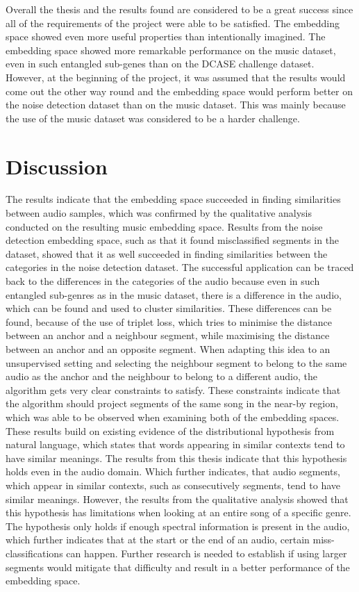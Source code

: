 \newline
\newline
Overall the thesis and the results found are considered to be a great success since all of the requirements of the project were able to be satisfied. The embedding space showed even more useful properties than intentionally imagined. The embedding space showed more remarkable performance on the music dataset, even in such entangled sub-genes than on the \gls{DCASE} challenge dataset. However, at the beginning of the project, it was assumed that the results would come out the other way round and the embedding space would perform better on the noise detection dataset than on the music dataset. This was mainly because the use of the music dataset was considered to be a harder challenge.

\section{Discussion}
\label{sec:Discussion}
The results indicate that the embedding space succeeded in finding similarities between audio samples, which was confirmed by the qualitative analysis conducted on the resulting music embedding space. Results from the noise detection embedding space, such as that it found misclassified segments in the dataset, showed that it as well succeeded in finding similarities between the categories in the noise detection dataset. The successful application can be traced back to the differences in the categories of the audio because even in such entangled sub-genres as in the music dataset, there is a difference in the audio, which can be found and used to cluster similarities. These differences can be found, because of the use of triplet loss, which tries to minimise the distance between an anchor and a neighbour segment, while maximising the distance between an anchor and an opposite segment. When adapting this idea to an unsupervised setting and selecting the neighbour segment to belong to the same audio as the anchor and the neighbour to belong to a different audio, the algorithm gets very clear constraints to satisfy. These constraints indicate that the algorithm should project segments of the same song in the near-by region, which was able to be observed when examining both of the embedding spaces.
\newline
\newline
These results build on existing evidence of the distributional hypothesis from natural language, which states that words appearing in similar contexts tend to have similar meanings. The results from this thesis indicate that this hypothesis holds even in the audio domain. Which further indicates, that audio segments, which appear in similar contexts, such as consecutively segments, tend to have similar meanings. However, the results from the qualitative analysis showed that this hypothesis has limitations when looking at an entire song of a specific genre. The hypothesis only holds if enough spectral information is present in the audio, which further indicates that at the start or the end of an audio, certain miss-classifications can happen. Further research is needed to establish if using larger segments would mitigate that difficulty and result in a better performance of the embedding space. 

